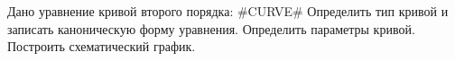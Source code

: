 Дано уравнение кривой второго порядка:
#CURVE#
Определить тип кривой и записать каноническую форму уравнения. Определить параметры кривой. Построить схематический график. 
